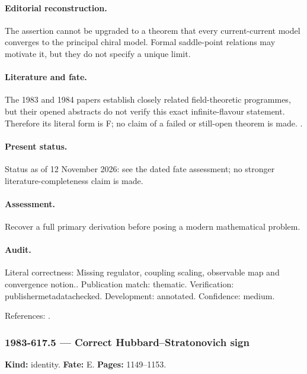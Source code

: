 \paragraph{Editorial reconstruction.} The assertion cannot be upgraded to a theorem that every current-current model converges to the principal chiral model. Formal saddle-point relations may motivate it, but they do not specify a unique limit.

\paragraph{Literature and fate.} The 1983 and 1984 papers establish closely related field-theoretic programmes, but their opened abstracts do not verify this exact infinite-flavour statement. Therefore its literal form is F; no claim of a failed or still-open theorem is made. \citep{polyakovwiegmann1983goldstone,wiegmann1984sun}.

\paragraph{Present status.} Status as of 12 November 2026: see the dated fate assessment; no stronger literature-completeness claim is made.

\paragraph{Assessment.} Recover a full primary derivation before posing a modern mathematical problem.

\paragraph{Audit.} Literal correctness: Missing regulator, coupling scaling, observable map and convergence notion.. Publication match: thematic. Verification: publishermetadatachecked. Development: annotated. Confidence: medium.

\noindent References: \citep{polyakovwiegmann1983goldstone,wiegmann1984sun}.\par

\subsubsection{1983-617.5 --- Correct Hubbard--Stratonovich sign}

\label{item:1983-617.5}

\noindent\textbf{Kind:} identity. \textbf{Fate:} E. \textbf{Pages:} 1149--1153.\par

